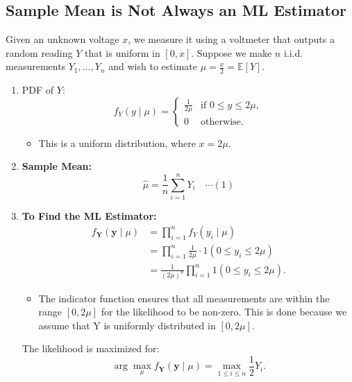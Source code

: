 \subsection{Sample Mean is Not Always an ML Estimator}
\begin{example}
    Given an unknown voltage \( x \), we measure it using a voltmeter that outputs a random reading \( Y \) that is uniform in \( [0, x] \). Suppose we make \( n \) i.i.d. measurements \( Y_1, \dots, Y_n \) and wish to estimate \( \mu = \frac{x}{2} = \mathbb{E}[Y] \).
    \begin{enumerate}
        \item PDF of \( Y \):
        \begin{equation*}
            f_Y(y \mid \mu) = 
            \begin{cases}
                \frac{1}{2\mu} & \text{if } 0 \leq y \leq 2\mu, \\
                0 & \text{otherwise}.
            \end{cases}
        \end{equation*}
        \begin{itemize}
            \item This is a uniform distribution, where $x = 2\mu$. 
        \end{itemize}
        \item \textbf{Sample Mean:} 
        \[
        \hat{\mu} = \frac{1}{n} \sum_{i=1}^n Y_i \quad \cdots (1)
        \]

        \item \textbf{To Find the ML Estimator:}
        \begin{align*}
            f_{\mathbf{Y}}(\mathbf{y} \mid \mu) &= \prod_{i=1}^n f_Y(y_i \mid \mu) \\
            &= \prod_{i=1}^n \frac{1}{2\mu} \cdot 1(0 \leq y_i \leq 2\mu) \\
            &= \frac{1}{(2\mu)^n} \prod_{i=1}^n 1(0 \leq y_i \leq 2\mu).
        \end{align*}
        \begin{itemize}
            \item The indicator function ensures that all measurements are within the range \( [0, 2\mu] \) for the likelihood to be non-zero. This is done because we assume that Y is uniformly distributed in \( [0, 2\mu] \).
        \end{itemize}
        
        The likelihood is maximized for:
        \[
        \arg\max_{\mu} f_{\mathbf{Y}}(\mathbf{y} \mid \mu) = \max_{1 \leq i \leq n} \frac{1}{2} Y_i.
        \]


\end{enumerate}
\end{example}
